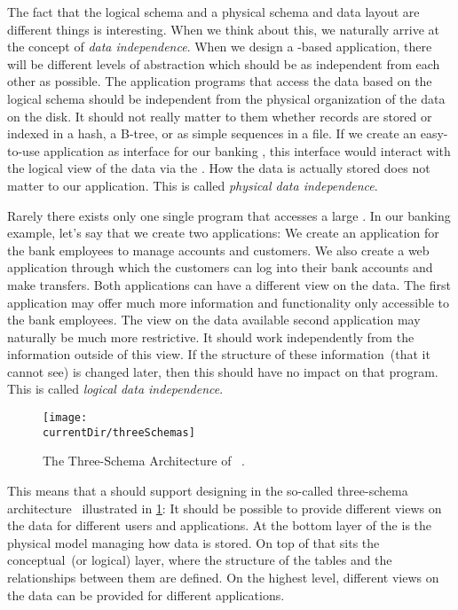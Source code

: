 The fact that the logical schema and a physical schema and data layout are different things is interesting.
When we think about this, we naturally arrive at the concept of \emph{data independence}.
When we design a -based application, there will be different levels of abstraction which should be as independent from each other as possible.
The application programs that access the data based on the logical schema should be independent from the physical organization of the data on the disk.
It should not really matter to them whether records are stored or indexed in a hash, a B\nobreakdashes-tree, or as simple sequences in a file.
If we create an easy-to-use application as interface for our banking , this interface would interact with the logical view of the data via the .
How the data is actually stored does not matter to our application.
This is called \emph{physical data independence}.

Rarely there exists only one single program that accesses a large \db.
In our banking example, let's say that we create two applications:
We create an application for the bank employees to manage accounts and customers.
We also create a web application through which the customers can log into their bank accounts and make transfers.
Both applications can have a different view on the data.
The first application may offer much more information and functionality only accessible to the bank employees.
The view on the data available second application may naturally be much more restrictive.
It should work independently from the information outside of this view.
If the structure of these information~(that it cannot see) is changed later, then this should have no impact on that program.
This is called \emph{logical data independence}.

\begin{figure}%
\centering%
\texttt{[image: \\currentDir/threeSchemas]}%
\caption{The Three-Schema Architecture of ~\cite{AXSSGDMS1978FRODMS,TK1978TAXSDFROTSGODMS,BFJKMRGRT1985RMFDSDAFTGDOTAXSDSSG,SS2005EIDDDFDB:I}.}%
\label{fig:threeSchemas}%
\end{figure}

This means that a  should support designing  in the so-called three-schema architecture~\cite{AXSSGDMS1978FRODMS,TK1978TAXSDFROTSGODMS,BFJKMRGRT1985RMFDSDAFTGDOTAXSDSSG,SS2005EIDDDFDB:I} illustrated in \cref{fig:threeSchemas}:
It should be possible to provide different views on the data for different users and applications.
At the bottom layer of the  is the physical model managing how data is stored.
On top of that sits the conceptual~(or logical) layer, where the structure of the tables and the relationships between them are defined.
On the highest level, different views on the data can be provided for different applications.

